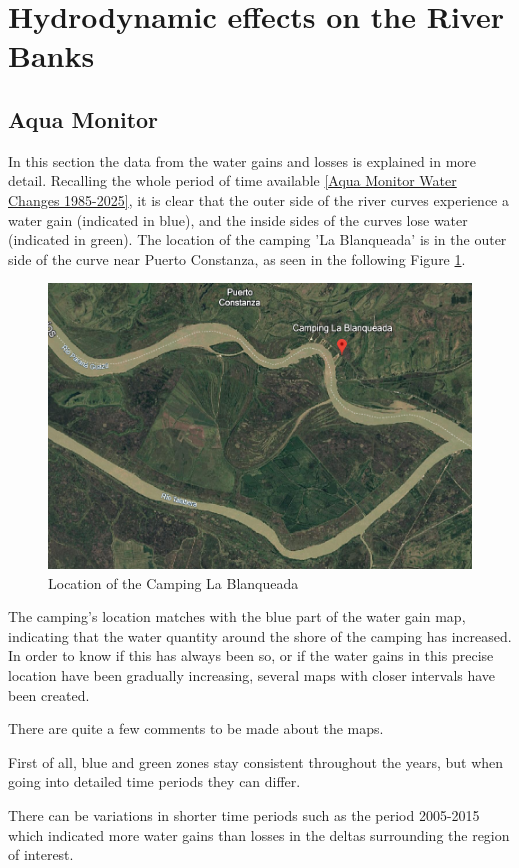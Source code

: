 \section{Hydrodynamic effects on the River Banks}
\subsection{Aqua Monitor}
\label{section:cirtical_location}
In this section the data from the water gains and losses is explained in more detail.
Recalling the whole period of time available \ref{Aqua Monitor Water Changes 1985-2025}, it is clear that the outer side of the river curves experience a water gain (indicated in blue), and the inside sides of the curves lose water (indicated in green). 
The location of the camping 'La Blanqueada' is in the outer side of the curve near Puerto Constanza, as seen in the following Figure \ref{fig:Camping Blanqueada}.

\begin{figure}[H]
    \centering
    \includegraphics[width=0.5\linewidth]{figures/ch5/Camping Blanqueada.png}
    \caption{Location of the Camping La Blanqueada}
    \label{fig:Camping Blanqueada}
\end{figure}

The camping's location matches with the blue part of the water gain map, indicating that the water quantity around the shore of the camping has increased. 
In order to know if this has always been so, or if the water gains in this precise location have been gradually increasing, several maps with closer intervals have been created. 

There are quite a few comments to be made about the maps. 

First of all, blue and green zones stay consistent throughout the years, but when going into detailed time periods they can differ.

There can be variations in shorter time periods such as the period 2005-2015 which indicated more water gains than losses in the deltas surrounding the region of interest.

